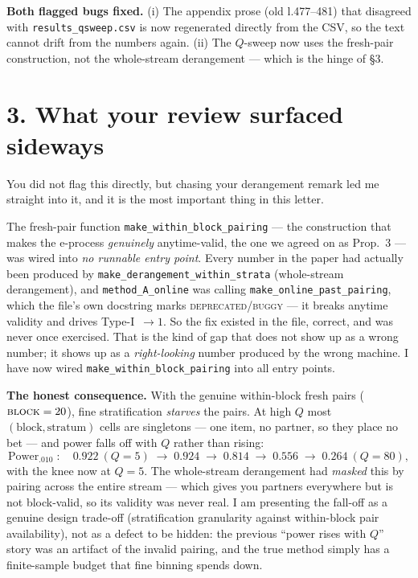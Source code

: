 \documentclass[11pt,a4paper]{article}
\begin{document}
\noindent\textbf{Both flagged bugs fixed.} (i) The appendix prose (old
l.477--481) that disagreed with \texttt{results\_qsweep.csv} is now regenerated
directly from the CSV, so the text cannot drift from the numbers again. (ii) The
$Q$-sweep now uses the fresh-pair construction, not the whole-stream derangement
--- which is the hinge of \S3.

\section*{3. What your review surfaced sideways}

\noindent You did not flag this directly, but chasing your derangement remark led
me straight into it, and it is the most important thing in this letter.

The fresh-pair function \texttt{make\_within\_block\_pairing} --- the construction
that makes the e-process \emph{genuinely} anytime-valid, the one we agreed on as
Prop.~3 --- was wired into \emph{no runnable entry point}. Every number in the
paper had actually been produced by \texttt{make\_derangement\_within\_strata}
(whole-stream derangement), and \texttt{method\_A\_online} was calling
\texttt{make\_online\_past\_pairing}, which the file's own docstring marks
\textsc{deprecated/buggy} --- it breaks anytime validity and drives
Type-I~$\to 1$. So the fix existed in the file, correct, and was never once
exercised. That is the kind of gap that does not show up as a wrong number; it
shows up as a \emph{right-looking} number produced by the wrong machine. I have
now wired \texttt{make\_within\_block\_pairing} into all entry points.

\medskip
\noindent\textbf{The honest consequence.} With the genuine within-block fresh
pairs ($\textsc{block} = 20$), fine stratification \emph{starves} the pairs. At
high $Q$ most $(\text{block}, \text{stratum})$ cells are singletons --- one item,
no partner, so they place no bet --- and power falls off with $Q$ rather than
rising:
\[
  \text{Power}_{.010}\;:\quad
  0.922\ (Q{=}5)\;\to\;0.924\;\to\;0.814\;\to\;0.556\;\to\;0.264\ (Q{=}80),
\]
with the knee now at $Q = 5$. The whole-stream derangement had \emph{masked}
this by pairing across the entire stream --- which gives you partners everywhere
but is not block-valid, so its validity was never real. I am presenting the
fall-off as a genuine design trade-off (stratification granularity against
within-block pair availability), not as a defect to be hidden: the previous
``power rises with $Q$'' story was an artifact of the invalid pairing, and the
true method simply has a finite-sample budget that fine binning spends down.
\end{document}
